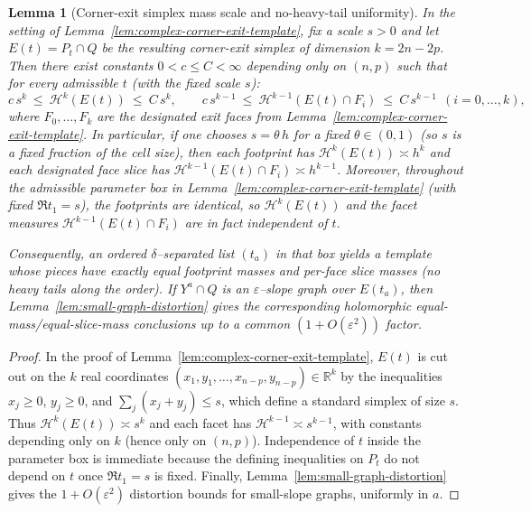 \documentclass[11pt]{article}
\numberwithin{equation}{section}  %
\theoremstyle{plain}
\newtheorem{lemma}[theorem]{Lemma}
\theoremstyle{definition}
\theoremstyle{remark}
\newcommand{\R}{\mathbb{R}}
\begin{document}
\begin{lemma}[Corner-exit simplex mass scale and no-heavy-tail uniformity]\label{lem:corner-exit-mass-scale}
In the setting of Lemma~\ref{lem:complex-corner-exit-template}, fix a scale $s>0$ and let $E(t)=P_t\cap Q$ be the resulting corner-exit simplex of
dimension $k=2n-2p$.
Then there exist constants $0<c\le C<\infty$ depending only on $(n,p)$ such that for every admissible $t$ (with the fixed scale $s$):
\[
c\,s^{k}\ \le\ \mathcal H^{k}(E(t))\ \le\ C\,s^{k},
\qquad
c\,s^{k-1}\ \le\ \mathcal H^{k-1}(E(t)\cap F_i)\ \le\ C\,s^{k-1}\ \ (i=0,\dots,k),
\]
where $F_0,\dots,F_k$ are the designated exit faces from Lemma~\ref{lem:complex-corner-exit-template}.
In particular, if one chooses $s=\theta\,h$ for a fixed $\theta\in(0,1)$ (so $s$ is a fixed fraction of the cell size), then each footprint has
$\mathcal H^k(E(t))\asymp h^k$ and each designated face slice has $\mathcal H^{k-1}(E(t)\cap F_i)\asymp h^{k-1}$.
Moreover, throughout the admissible parameter box in Lemma~\ref{lem:complex-corner-exit-template} (with fixed $\Re t_1=s$), the footprints are identical,
so $\mathcal H^{k}(E(t))$ and the facet measures $\mathcal H^{k-1}(E(t)\cap F_i)$ are in fact independent of $t$.

\smallskip\noindent
Consequently, an ordered $\delta$--separated list $(t_a)$ in that box yields a template whose pieces have \emph{exactly equal} footprint masses and
per-face slice masses (no heavy tails along the order).  If $Y^a\cap Q$ is an $\varepsilon$--slope graph over $E(t_a)$, then
Lemma~\ref{lem:small-graph-distortion} gives the corresponding holomorphic equal-mass/equal-slice-mass conclusions up to a common $(1+O(\varepsilon^2))$ factor.
\end{lemma}
\begin{proof}
In the proof of Lemma~\ref{lem:complex-corner-exit-template}, $E(t)$ is cut out on the $k$ real coordinates
$(x_1,y_1,\dots,x_{n-p},y_{n-p})\in\R^{k}$ by the inequalities
$x_j\ge 0$, $y_j\ge 0$, and $\sum_j(x_j+y_j)\le s$, which define a standard simplex of size $s$.
Thus $\mathcal H^{k}(E(t))\asymp s^{k}$ and each facet has $\mathcal H^{k-1}\asymp s^{k-1}$, with constants depending only on $k$ (hence only on $(n,p)$).
Independence of $t$ inside the parameter box is immediate because the defining inequalities on $P_t$ do not depend on $t$ once $\Re t_1=s$ is fixed.
Finally, Lemma~\ref{lem:small-graph-distortion} gives the $1+O(\varepsilon^2)$ distortion bounds for small-slope graphs, uniformly in $a$.
\end{proof}
\end{document}
